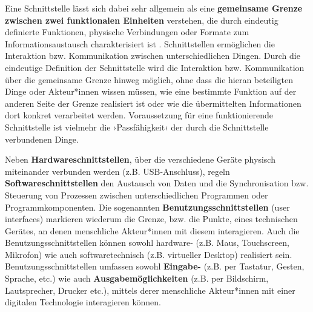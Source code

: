 \documentclass[
  a4paper,
]{book}
\begin{document}
Eine Schnittstelle lässt sich dabei sehr allgemein als eine \textbf{gemeinsame Grenze zwischen zwei funktionalen Einheiten} verstehen, die durch eindeutig definierte Funktionen, physische Verbindungen oder Formate zum Informationsaustausch charakterisiert ist \citep[vgl.][]{iec23822015InformationTechnologyVocabulary2015}. Schnittstellen ermöglichen die Interaktion bzw. Kommunikation zwischen unterschiedlichen Dingen. Durch die eindeutige Definition der Schnittstelle wird die Interaktion bzw. Kommunikation über die gemeinsame Grenze hinweg möglich, ohne dass die hieran beteiligten Dinge oder Akteur*innen wissen müssen, wie eine bestimmte Funktion auf der anderen Seite der Grenze realisiert ist oder wie die übermittelten Informationen dort konkret verarbeitet werden. Voraussetzung für eine funktionierende Schnittstelle ist vielmehr die ›Passfähigkeit‹ der durch die Schnittstelle verbundenen Dinge.

Neben \textbf{Hardwareschnittstellen}, über die verschiedene Geräte physisch miteinander verbunden werden (z.B. USB-Anschluss), regeln \textbf{Softwareschnittstellen} den Austausch von Daten und die Synchronisation bzw. Steuerung von Prozessen zwischen unterschiedlichen Programmen oder Programmkomponenten. Die sogenannten \textbf{Benutzungsschnittstellen} (user interfaces) markieren wiederum die Grenze, bzw. die Punkte, eines technischen Gerätes, an denen menschliche Akteur*innen mit diesem interagieren. Auch die Benutzungsschnittstellen können sowohl hardware- (z.B. Maus, Touchscreen, Mikrofon) wie auch softwaretechnisch (z.B. virtueller Desktop) realisiert sein. Benutzungsschnittstellen umfassen sowohl \textbf{Eingabe-} (z.B. per Tastatur, Gesten, Sprache, etc.) wie auch \textbf{Ausgabemöglichkeiten} (z.B. per Bildschirm, Lautsprecher, Drucker etc.), mittels derer menschliche Akteur*innen mit einer digitalen Technologie interagieren können.
\end{document}
